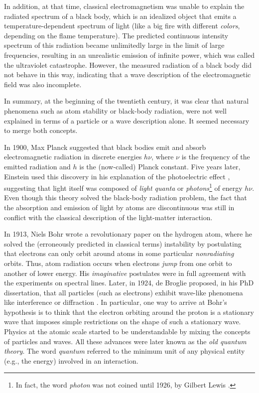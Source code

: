 \documentclass[onecolumn,nofootinbib, secnumarabic, amsmath, nobibnotes,11pt,aps,pra]{revtex4-1}
\begin{document}
In addition, at that time, classical electromagnetism was unable to
explain the radiated spectrum of a black body, which is an idealized
object that emits a temperature-dependent spectrum of light (like a
big fire with different \textit{colors}, depending on
the flame temperature). The predicted continuous intensity spectrum
of this radiation became unlimitedly large in the limit of large frequencies,
resulting in an unrealistic emission of infinite power, which was
called the ultraviolet catastrophe. However, the measured radiation
of a black body did not behave in this way, indicating that a wave
description of the electromagnetic field was also incomplete.

In summary, at the beginning of the twentieth century, it was clear that natural phenomena such as atom stability or black-body radiation, were not well explained in terms of a particle or a wave description alone. It seemed necessary to merge both concepts.

In 1900, Max Planck suggested \cite{om.Planck-BlackBody} that black
bodies emit and absorb electromagnetic radiation in discrete
energies $h\nu$, where $\nu$ is the frequency of the emitted
radiation and $h$ is the (now-called) Planck constant. Five years
later, Einstein used this discovery in his explanation of the
photoelectric effect \cite{om.Einstein-Photoelectric}, suggesting
that light itself was composed of \textit{light quanta} or
\textit{photons}\footnote{In fact, the word \textit{photon} was not
coined until 1926, by Gilbert Lewis \cite{om.gilbert1926}.} of
energy $h\nu$. Even though this theory solved the black-body
radiation problem, the fact that the absorption and emission of
light by atoms are discontinuous was still in conflict with the
classical description of the light-matter interaction.

In 1913, Niels Bohr \cite{om.bohr,om.bohr2,om.bohr3} wrote a
revolutionary paper on the hydrogen atom, where he solved the
(erroneously predicted in classical terms) instability by
postulating that electrons can only orbit around atoms in some
particular \textit{nonradiating} orbits. Thus, atom radiation occurs
when electrons \textit{jump} from one orbit to another of lower
energy. His \textit{imaginative} postulates were in full agreement
with the experiments on spectral lines. Later, in 1924, de Broglie
proposed, in his PhD dissertation, that all particles (such as
electrons) exhibit wave-like phenomena like interference or
diffraction \cite{om.debroglie1923}. In particular, one way to
arrive at Bohr's hypothesis is to think that the electron orbiting
around the proton is a stationary wave that imposes simple
restrictions on the shape of such a stationary wave. Physics at the
atomic scale started to be understandable by mixing the concepts of
particles and waves. All these advances were later known as the
\textit{old quantum theory}. The word \textit{quantum} referred to
the minimum unit of any physical entity (e.g., the energy) involved
in an interaction.
\end{document}
